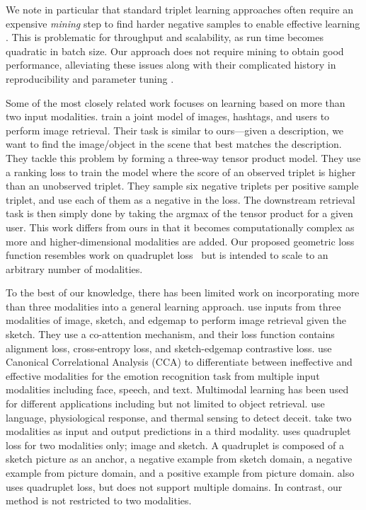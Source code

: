 \documentclass[10pt]{article} %
\begin{document}
We note in particular that standard triplet learning approaches often require an expensive \textit{mining} step to find harder negative samples to enable effective learning \citep{Hoffer2015,Schroff2015,DBLP:conf/eccv/2018-9,DBLP:conf/eccv/ZhaoJQLH18,Zhai2018}. This is problematic for throughput and scalability, as run time becomes quadratic in batch size. Our approach does not require mining to obtain good performance, alleviating these issues along with their complicated history in reproducibility and parameter tuning \citep{Musgrave2020,Raff2020c,Raff2019_quantify_repro}. 

Some of the most closely related work focuses on learning based on more than two input modalities. \citet{Veit_2018_CVPR} train a joint model of images, hashtags, and users to perform image retrieval. Their task is similar to ours---given a description, we want to find the image/object in the scene that best matches the description. They tackle this problem by forming a three-way tensor product model. They use a ranking loss to train the model where the score of an observed triplet is higher than an unobserved triplet. They sample six negative triplets per positive sample triplet, and use each of them as a negative in the loss. The downstream retrieval task is then simply done by taking the argmax of the tensor product for a given user. This work differs from ours in that it becomes computationally complex as more and higher-dimensional modalities are added.
Our proposed geometric loss function resembles work on quadruplet loss~\citep{chen2017beyond,tursun2021efficient} but is intended to scale to an arbitrary number of modalities.

To the best of our knowledge, there has been limited work on incorporating more than three modalities into a general learning approach. \citet{semihet_three_way_Lei_2020} use inputs from three modalities of image, sketch, and edgemap to perform image retrieval given the sketch. They use a co-attention mechanism, and their loss function contains alignment loss, cross-entropy loss, and sketch-edgemap contrastive loss. \citet{Mittal2020M3ER} use Canonical Correlational Analysis (CCA) to differentiate between ineffective and effective modalities for the emotion recognition task from multiple input modalities including face, speech, and text. Multimodal learning has been used for different applications including but not limited to object retrieval. \citet{Deception_ICMI_2014} use language, physiological response, and thermal sensing to detect deceit. \citet{het_data_fusion_liu_IEEE_2017} take two modalities as input and output predictions in a third modality. \citet{tursun2021efficient} uses quadruplet loss for two modalities only; image and sketch. A quadruplet is composed of a sketch picture as an anchor, a negative example from sketch domain, a negative example from picture domain, and a positive example from picture domain. \citet{chen2017beyond} also uses quadruplet loss, but does not support multiple domains. In contrast, our method is not restricted to two modalities.
 
\end{document}
